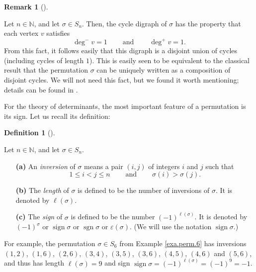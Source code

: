 \documentclass[numbers=enddot,12pt,final,onecolumn,notitlepage]{scrartcl}%
\numberwithin{exer}{subsection}
\theoremstyle{definition}
\newtheorem{defi}[theo]{Definition}
\newenvironment{definition}[1][]
{\begin{defi}[#1]\begin{leftbar}}
{\end{leftbar}\end{defi}}
\newtheorem{remk}[theo]{Remark}
\newenvironment{remark}[1][]
{\begin{remk}[#1]\begin{leftbar}}
{\end{leftbar}\end{remk}}
\begin{document}
\begin{remark}
Let $n\in\mathbb{N}$, and let $\sigma\in S_{n}$. Then, the cycle digraph of
$\sigma$ has the property that each vertex $v$ satisfies%
\[
\deg^{-}v=1\ \ \ \ \ \ \ \ \ \ \text{and}\ \ \ \ \ \ \ \ \ \ \deg^{+}v=1.
\]
From this fact, it follows easily that this digraph is a disjoint union of
cycles (including cycles of length $1$). This is easily seen to be equivalent
to the classical result that the permutation $\sigma$ can be uniquely written
as a composition of disjoint cycles. We will not need this fact, but we found
it worth mentioning; details can be found in \cite[proof of Theorem
5.5.2]{lecs}.
\end{remark}

For the theory of determinants, the most important feature of a permutation is
its sign. Let us recall its definition:

\begin{definition}
Let $n\in\mathbb{N}$, and let $\sigma\in S_{n}$.

\begin{enumerate}
\item[\textbf{(a)}] An \emph{inversion} of $\sigma$ means a pair $\left(
i,j\right)  $ of integers $i$ and $j$ such that%
\[
1\leq i<j\leq n\ \ \ \ \ \ \ \ \ \ \text{and}\ \ \ \ \ \ \ \ \ \ \sigma\left(
i\right)  >\sigma\left(  j\right)  .
\]


\item[\textbf{(b)}] The \emph{length} of $\sigma$ is defined to be the number
of inversions of $\sigma$. It is denoted by $\ell\left(  \sigma\right)  $.

\item[\textbf{(c)}] The \emph{sign} of $\sigma$ is defined to be the number
$\left(  -1\right)  ^{\ell\left(  \sigma\right)  }$. It is denoted by $\left(
-1\right)  ^{\sigma}$ or $\operatorname*{sign}\sigma$ or $\operatorname*{sgn}%
\sigma$ or $\varepsilon\left(  \sigma\right)  $. (We will use the notation
$\operatorname*{sign}\sigma$.)
\end{enumerate}
\end{definition}

For example, the permutation $\sigma\in S_{6}$ from Example \ref{exa.perm.6}
has inversions $\left(  1,2\right)  $, $\left(  1,6\right)  $, $\left(
2,6\right)  $, $\left(  3,4\right)  $, $\left(  3,5\right)  $, $\left(
3,6\right)  $, $\left(  4,5\right)  $, $\left(  4,6\right)  $ and $\left(
5,6\right)  $, and thus has length $\ell\left(  \sigma\right)  =9$ and sign
$\operatorname*{sign}\sigma=\left(  -1\right)  ^{\ell\left(  \sigma\right)
}=\left(  -1\right)  ^{9}=-1$.
\end{document}
